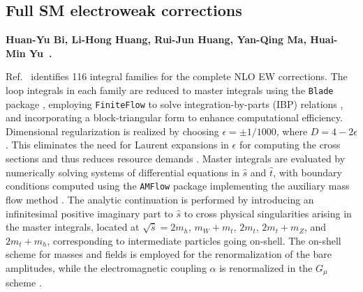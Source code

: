\subsection{Full SM electroweak corrections}

\label{EW:full}

\textbf{Huan-Yu Bi, Li-Hong Huang, Rui-Jun Huang, Yan-Qing Ma, Huai-Min Yu~\cite{Bi:2023bnq}.}

\noindent Ref.~\cite{Bi:2023bnq} identifies 116 integral families for the complete NLO EW corrections. The loop integrals in each family are reduced to master integrals using the {\tt Blade} package \cite{Blade}, employing {\tt FiniteFlow} \cite{Peraro:2019svx} to solve integration-by-parts (IBP) relations \cite{Chetyrkin:1981qh}, and incorporating a block-triangular form \cite{Liu:2018dmc,Guan:2019bcx} to enhance computational efficiency. Dimensional regularization is realized by choosing $\epsilon=\pm1/1000$, where $D=4-2\epsilon$. This eliminates the need for Laurent expansions in $\epsilon$ for computing the cross sections and thus reduces resource demands \cite{Liu:2022chg,Liu:2022mfb}. Master integrals are evaluated by numerically solving systems of differential equations \cite{Kotikov:1990kg,Remiddi:1997ny,Caffo:2008aw,Czakon:2008zk,Lee:2014ioa,Moriello:2019yhu,Hidding:2020ytt,Armadillo:2022ugh} in $\hat{s}$ and $\hat{t}$,  with boundary conditions computed using the {\tt AMFlow} package \cite{Liu:2022chg} implementing the auxiliary mass flow method \cite{Liu:2022mfb,Liu:2021wks,Liu:2017jxz}. The analytic continuation is performed by introducing an infinitesimal positive imaginary part to $\hat{s}$ to cross physical singularities arising in the master integrals, located at $\sqrt{\hat{s}}=2m_h$, $m_W+m_t$, $2m_t$, $2m_t+m_Z$, and $2m_t+m_h$, corresponding to intermediate particles going on-shell. The on-shell scheme for masses and fields is employed for the renormalization of the bare amplitudes, while the electromagnetic coupling $\alpha$ is renormalized in the $G_{\mu}$ scheme \cite{Denner:2019vbn}.

